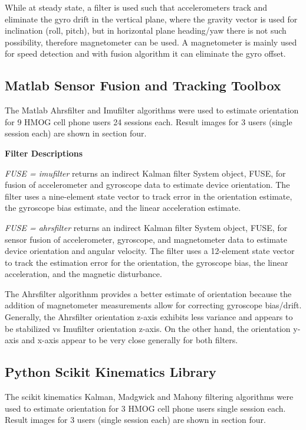 \documentclass{article}
\begin{document}
While at steady state, a filter is used such that accelerometers track and eliminate the gyro drift in the vertical plane, where the gravity vector is used for inclination (roll, pitch), but in horizontal plane heading/yaw there is not such possibility, therefore magnetometer can be used. A magnetometer is mainly used for speed detection and with fusion algorithm it can eliminate the gyro offset.

\subsection{Matlab Sensor Fusion and Tracking Toolbox}

The Matlab Ahrsfilter and Imufilter algorithms were used to estimate orientation for 9 HMOG cell phone users 24 sessions each. Result images for 3 users (single session each) are shown in section four.

\textbf{Filter Descriptions}

\textit{FUSE = imufilter} returns an indirect Kalman filter System object, FUSE, for fusion of accelerometer and gyroscope data to estimate device orientation. The filter uses a nine-element state vector to track error in the orientation estimate, the gyroscope bias estimate, and the linear acceleration estimate.

\textit{FUSE = ahrsfilter} returns an indirect Kalman filter System object, FUSE, for sensor fusion of accelerometer, gyroscope, and magnetometer data to estimate device orientation and angular velocity. The filter uses a 12-element state vector to track the estimation error for the orientation, the gyroscope bias, the linear acceleration, and the magnetic disturbance.

The Ahrsfilter algorithnm provides a better estimate of orientation because the addition of magnetometer measurements allow for correcting gyroscope bias/drift. Generally, the Ahrsfilter orientation z-axis exhibits less variance and appears to be stabilized vs Imufilter orientation z-axis. On the other hand, the orientation y-axis and x-axis appear to be very close generally for both filters.

\subsection{Python Scikit Kinematics Library}

The scikit kinematics Kalman, Madgwick and Mahony filtering algorithms were used to estimate orientation for 3 HMOG cell phone users single session each. Result images for 3 users (single session each) are shown in section four.
\end{document}
